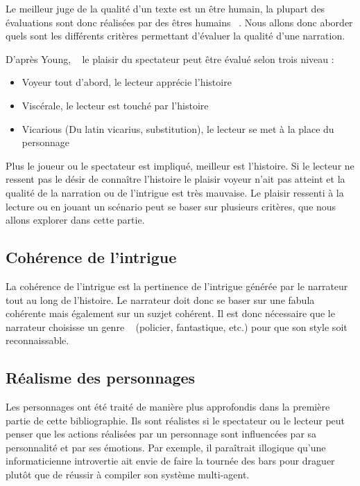 \documentclass[asi]{picINSA}
\begin{document}
Le meilleur juge de la qualité d'un texte est un être humain, la plupart des évaluations sont donc réalisées par des êtres humains ~\cite{Callaway2002213}. Nous allons donc aborder quels sont les différents critères permettant d'évaluer la qualité d'une narration.

D'après Young, ~\cite{young2004architecture} le plaisir du spectateur peut être évalué selon trois niveau :
\begin{itemize}
\item Voyeur tout d'abord, le lecteur apprécie l'histoire
\item Viscérale, le lecteur est touché par l'histoire
\item Vicarious (Du latin vicarius, substitution), le lecteur se met à la place du personnage \\
\end{itemize}

Plus le joueur ou le spectateur est impliqué, meilleur est l'histoire. Si le lecteur ne ressent pas le désir de connaître l'histoire le plaisir voyeur n'ait pas atteint et la qualité de la narration ou de l'intrigue est très mauvaise. Le plaisir ressenti à la lecture ou en jouant un scénario peut se baser sur plusieurs critères, que nous allons explorer dans cette partie.

\subsection{Cohérence de l'intrigue}

La cohérence de l'intrigue est la pertinence de l'intrigue générée par le narrateur tout au long de l'histoire. Le narrateur doit donc se baser sur une fabula cohérente mais également sur un suzjet cohérent. Il est donc nécessaire que le narrateur choisisse un genre ~\cite{Ciarlini:2010:ERP:1658866.1658874} (policier, fantastique, etc.) pour que son style soit reconnaissable.

\subsection{Réalisme des personnages}

Les personnages ont été traité de manière plus approfondis dans la première partie de cette bibliographie. Ils sont réalistes si le spectateur ou le lecteur peut penser que les actions réalisées par un personnage sont influencées par sa personnalité et par ses émotions. Par exemple, il paraîtrait illogique qu'une informaticienne introvertie ait envie de faire la tournée des bars pour draguer plutôt que de réussir à compiler son système multi-agent. \\
\end{document}
